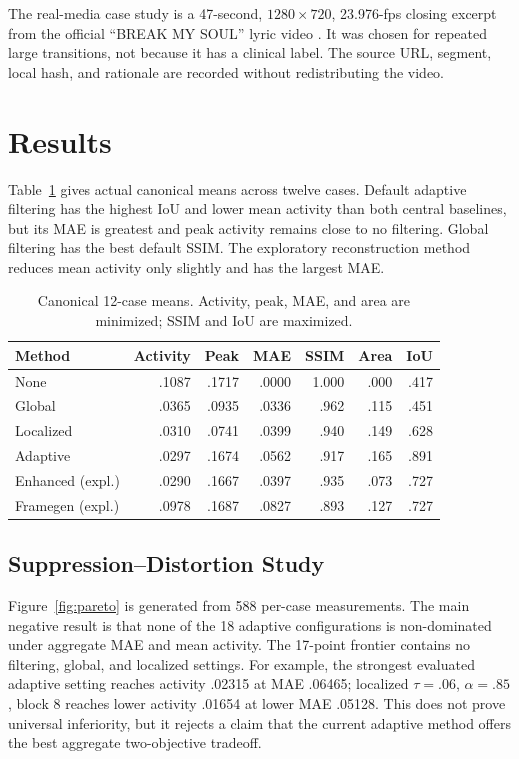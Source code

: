 \documentclass[9pt,twocolumn]{article}
\begin{document}
The real-media case study is a 47-second, $1280\times720$, 23.976-fps closing excerpt from the official ``BREAK MY SOUL'' lyric video \cite{beyonce2022break}. It was chosen for repeated large transitions, not because it has a clinical label. The source URL, segment, local hash, and rationale are recorded without redistributing the video.

\section{Results}
Table~\ref{tab:main} gives actual canonical means across twelve cases. Default adaptive filtering has the highest IoU and lower mean activity than both central baselines, but its MAE is greatest and peak activity remains close to no filtering. Global filtering has the best default SSIM. The exploratory reconstruction method reduces mean activity only slightly and has the largest MAE.

\begin{table}[h]
\centering\scriptsize
\caption{Canonical 12-case means. Activity, peak, MAE, and area are minimized; SSIM and IoU are maximized.}
\label{tab:main}
\begin{tabular}{lrrrrrr}\toprule
Method&Activity&Peak&MAE&SSIM&Area&IoU\\\midrule
None&.1087&.1717&.0000&1.000&.000&.417\\
Global&.0365&.0935&.0336&.962&.115&.451\\
Localized&.0310&.0741&.0399&.940&.149&.628\\
Adaptive&.0297&.1674&.0562&.917&.165&.891\\
Enhanced (expl.)&.0290&.1667&.0397&.935&.073&.727\\
Framegen (expl.)&.0978&.1687&.0827&.893&.127&.727\\\bottomrule
\end{tabular}
\end{table}

\subsection{Suppression--Distortion Study}
Figure~\ref{fig:pareto} is generated from 588 per-case measurements. The main negative result is that none of the 18 adaptive configurations is non-dominated under aggregate MAE and mean activity. The 17-point frontier contains no filtering, global, and localized settings. For example, the strongest evaluated adaptive setting reaches activity .02315 at MAE .06465; localized $\tau=.06$, $\alpha=.85$, block 8 reaches lower activity .01654 at lower MAE .05128. This does not prove universal inferiority, but it rejects a claim that the current adaptive method offers the best aggregate two-objective tradeoff.
\end{document}
